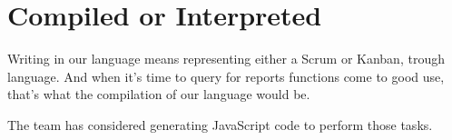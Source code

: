 \section{Compiled or Interpreted}
\label{sec:compiled-or-interpreted}
Writing in our language means representing either a Scrum or Kanban, trough language. And when it's time to query for reports functions come to good use, that's what the compilation of our language would be.

The team has considered generating JavaScript code to perform those tasks.
